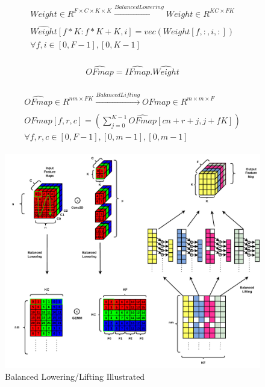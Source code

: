 \begin{align}
    \begin{gathered}
        Weight \in R^{F\times C\times K \times K} \xrightarrow[]{Balanced Lowering} \hat{Weight} \in R^{KC\times FK}\\
        \hat{Weight}[f*K:f*K+K, i] = vec(Weight[f, :, i, :]) \\
        \forall f,i \in [0, F-1], [0, K-1]
    \end{gathered}
    \label{math:balanced_lowering_weight}
\end{align}

\begin{align}
    \begin{gathered}
        \hat{OFmap} = \hat{IFmap}.\hat{Weight}
    \end{gathered}
    \label{math:balanced_lowering_gemm}
\end{align}

\begin{align}
    \begin{gathered}
        \hat{OFmap} \in R^{nm\times FK} \xrightarrow[]{Balanced Lifting} OFmap \in  R^{m\times m\times F}\\
        OFmap[f, r, c] = (\displaystyle\sum\limits_{j=0}^{K-1} \hat{OFmap}[cn+r+j, j+fK]) \\
        \forall f,r,c \in [0, F-1], [0, m-1], [0, m-1]
    \end{gathered}
    \label{math:balanced_lifting_ofmap}
\end{align}

\begin{figure}[!ht]
    \centering
    \includegraphics[scale=0.6]{fig/BalancedLoweringLifting.pdf}
    \caption{Balanced Lowering/Lifting Illustrated}
    \label{fig:balanced_lowering_lifting}
\end{figure}

